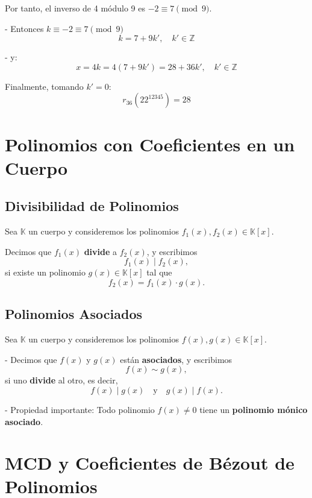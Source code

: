 \documentclass[a4paper,12pt]{article}
\begin{document}
\begin{ejemplo}[title=Ejemplo 2: mcd no es 1]

Por tanto, el inverso de 4 módulo 9 es \(-2 \equiv 7 \pmod{9}\).

- Entonces \(k \equiv -2 \equiv 7 \pmod{9}\)  
\[
k = 7 + 9k',\quad k' \in \mathbb{Z}
\]

- y:
\[
x = 4k = 4(7 + 9k') = 28 + 36k',\quad k' \in \mathbb{Z}
\]

Finalmente, tomando \(k' = 0\):
\[
r_{36}(22^{12345}) = 28
\]
\end{ejemplo}

\section{Polinomios con Coeficientes en un Cuerpo}

\subsection{Divisibilidad de Polinomios}

\begin{procedimiento}[title=Divisibilidad de polinomios]
Sea \(\mathbb{K}\) un cuerpo y consideremos los polinomios \(f_1(x), f_2(x) \in \mathbb{K}[x]\).

Decimos que \(f_1(x)\) \textbf{divide} a \(f_2(x)\), y escribimos
\[
f_1(x) \mid f_2(x),
\]
si existe un polinomio \(g(x) \in \mathbb{K}[x]\) tal que
\[
f_2(x) = f_1(x) \cdot g(x).
\]
\end{procedimiento}

\subsection{Polinomios Asociados}

\begin{procedimiento}[title=Polinomios asociados]
Sea \(\mathbb{K}\) un cuerpo y consideremos los polinomios \(f(x), g(x) \in \mathbb{K}[x]\).

- Decimos que \(f(x)\) y \(g(x)\) están \textbf{asociados}, y escribimos
\[
f(x) \sim g(x),
\]
si uno \textbf{divide} al otro, es decir,
\[
f(x) \mid g(x) \quad \text{y} \quad g(x) \mid f(x).
\]

- Propiedad importante: Todo polinomio \(f(x) \neq 0\) tiene un \textbf{polinomio mónico asociado}.
\end{procedimiento}

\section{MCD y Coeficientes de Bézout de Polinomios}
\end{document}
